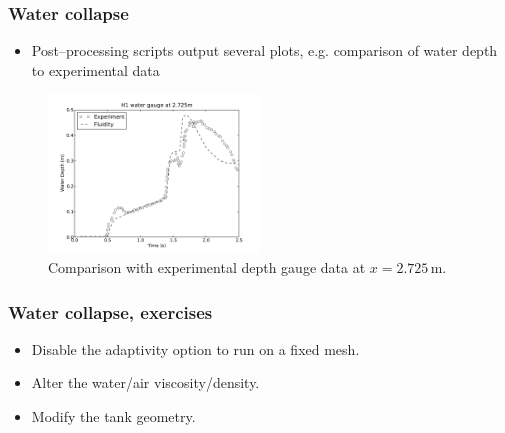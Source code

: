 %
\begin{frame}
    \frametitle{Water collapse}
\begin{itemize}
\item Post--processing scripts output several plots, e.g. comparison of water depth to experimental data
\end{itemize}
\begin{figure}
\centering
\includegraphics[width=0.5\textwidth]{./water_collapse/water_gauge_H1.pdf}
\caption{Comparison with experimental depth gauge data at $x = 2.725 \, $m.}
\end{figure}

\end{frame}
%
\begin{frame}
    \frametitle{Water collapse, exercises}
\begin{itemize}
\item Disable the adaptivity option to run on a fixed mesh.
\item Alter the water/air viscosity/density.
\item Modify the tank geometry.
\end{itemize}

\end{frame}
